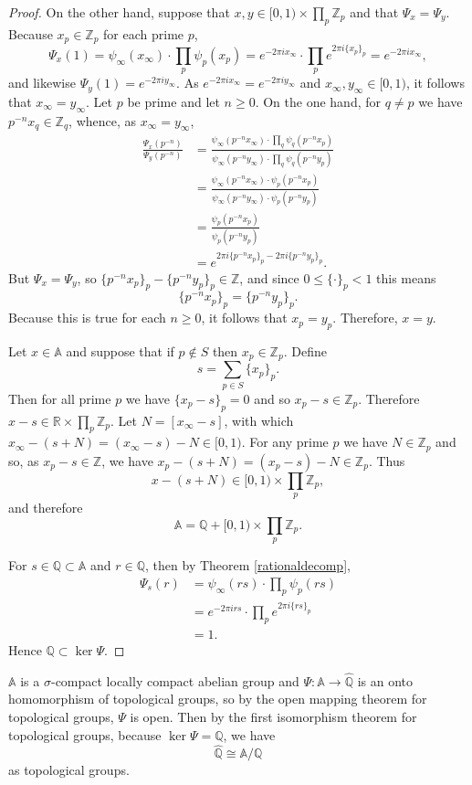 \documentclass{article}
\theoremstyle{definition}
\theoremstyle{definition}
\begin{document}
\begin{proof}
On the other hand, suppose that $x,y \in [0,1) \times \prod_p \mathbb{Z}_p$ and that
$\Psi_x=\Psi_y$. Because $x_p \in \mathbb{Z}_p$ for each prime $p$,
\[
\Psi_x(1) = \psi_\infty(x_\infty) \cdot \prod_p \psi_p(x_p) =
e^{-2\pi ix_\infty} \cdot \prod_p e^{2\pi i\{x_p\}_p}
=e^{-2\pi ix_\infty},
\]
and likewise $\Psi_y(1)=e^{-2\pi iy_\infty}$. As $e^{-2\pi ix_\infty}=e^{-2\pi iy_\infty}$ and
$x_\infty,y_\infty \in [0,1)$, it follows that $x_\infty=y_\infty$. 
Let $p$ be prime and let $n \geq 0$. On the one hand, for
$q \neq p$ we have $p^{-n}x_q \in \mathbb{Z}_q$, whence, as $x_\infty=y_\infty$,
\begin{align*}
\frac{\Psi_x(p^{-n})}{\Psi_y(p^{-n})} &= \frac{\psi_\infty(p^{-n}x_\infty) \cdot \prod_q \psi_q(p^{-n}x_p)}{ \psi_\infty(p^{-n}y_\infty) \cdot \prod_q \psi_q(p^{-n}y_p)}\\
&=\frac{\psi_\infty(p^{-n}x_\infty) \cdot \psi_p(p^{-n}x_p)}{\psi_\infty(p^{-n}y_\infty) \cdot \psi_p(p^{-n}y_p)}\\
&=\frac{\psi_p(p^{-n}x_p)}{\psi_p(p^{-n}y_p)}\\
&=e^{2\pi i\{p^{-n}x_p\}_p-2\pi i\{p^{-n}y_p\}_p}.
\end{align*}
But $\Psi_x=\Psi_y$, so $\{p^{-n}x_p\}_p-\{p^{-n}y_p\}_p \in \mathbb{Z}$, and since $0 \leq \{\cdot\}_p < 1$ this means
\[
\{p^{-n}x_p\}_p=\{p^{-n}y_p\}_p.
\]
Because this is true for each $n \geq 0$, it follows that $x_p=y_p$. Therefore, $x=y$.

Let $x \in \mathbb{A}$ and suppose that if $p \not \in S$ then $x_p \in \mathbb{Z}_p$. Define
\[
s = \sum_{p \in S} \{x_p\}_p.
\]
Then for all prime $p$ we have $\{x_p-s\}_p = 0$ and  so $x_p-s \in \mathbb{Z}_p$. Therefore
$x-s \in \mathbb{R} \times \prod_p \mathbb{Z}_p$. Let $N=[x_\infty-s]$, with which 
$x_\infty-(s+N)=(x_\infty-s)-N \in [0,1)$. 
For any prime $p$ we have
$N \in \mathbb{Z}_p$ and so, as $x_p-s \in \mathbb{Z}$, we have
$x_p-(s+N)=(x_p-s)-N \in \mathbb{Z}_p$. Thus 
\[
x-(s+N) \in [0,1) \times \prod_p \mathbb{Z}_p,
\]
and therefore
\[
\mathbb{A}=\mathbb{Q} + [0,1) \times \prod_p \mathbb{Z}_p.
\]


For $s \in \mathbb{Q} \subset \mathbb{A}$ and $r \in \mathbb{Q}$, then by Theorem \ref{rationaldecomp},
\begin{align*}
\Psi_s(r) &=   \psi_\infty(rs) \cdot \prod_p \psi_p(rs)\\
&=e^{-2\pi irs} \cdot \prod_p e^{2\pi i \{rs\}_p}\\
&=1.
\end{align*}
Hence $\mathbb{Q} \subset \ker \Psi$.
\end{proof}


$\mathbb{A}$ is a $\sigma$-compact locally compact abelian group and
$\Psi:\mathbb{A} \to \widehat{\mathbb{Q}}$ is an onto homomorphism of topological groups,
so by the open mapping theorem for topological groups, $\Psi$ is open. Then by the
first isomorphism theorem for topological groups, because $\ker \Psi = \mathbb{Q}$, we have
\[
\widehat{\mathbb{Q}} \cong \mathbb{A}/\mathbb{Q}
\]
as topological groups.
\end{document}
